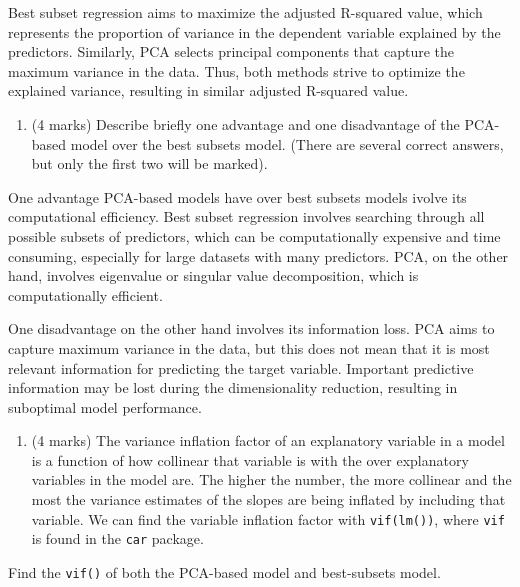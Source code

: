 \documentclass[
]{article}
\providecommand{\tightlist}{%
  \setlength{\itemsep}{0pt}\setlength{\parskip}{0pt}}
\begin{document}
Best subset regression aims to maximize the adjusted R-squared value,
which represents the proportion of variance in the dependent variable
explained by the predictors. Similarly, PCA selects principal components
that capture the maximum variance in the data. Thus, both methods strive
to optimize the explained variance, resulting in similar adjusted
R-squared value.

\newpage

\begin{enumerate}
\def\labelenumi{\arabic{enumi}.}
\setcounter{enumi}{7}
\tightlist
\item
  (4 marks) Describe briefly one advantage and one disadvantage of the
  PCA-based model over the best subsets model. (There are several
  correct answers, but only the first two will be marked).
\end{enumerate}

One advantage PCA-based models have over best subsets models ivolve its
computational efficiency. Best subset regression involves searching
through all possible subsets of predictors, which can be computationally
expensive and time consuming, especially for large datasets with many
predictors. PCA, on the other hand, involves eigenvalue or singular
value decomposition, which is computationally efficient.

One disadvantage on the other hand involves its information loss. PCA
aims to capture maximum variance in the data, but this does not mean
that it is most relevant information for predicting the target variable.
Important predictive information may be lost during the dimensionality
reduction, resulting in suboptimal model performance.

\newpage

\begin{enumerate}
\def\labelenumi{\arabic{enumi}.}
\setcounter{enumi}{8}
\tightlist
\item
  (4 marks) The variance inflation factor of an explanatory variable in
  a model is a function of how collinear that variable is with the over
  explanatory variables in the model are. The higher the number, the
  more collinear and the most the variance estimates of the slopes are
  being inflated by including that variable. We can find the variable
  inflation factor with \texttt{vif(lm())}, where \texttt{vif} is found
  in the \texttt{car} package.
\end{enumerate}

Find the \texttt{vif()} of both the PCA-based model and best-subsets
model.
\end{document}
